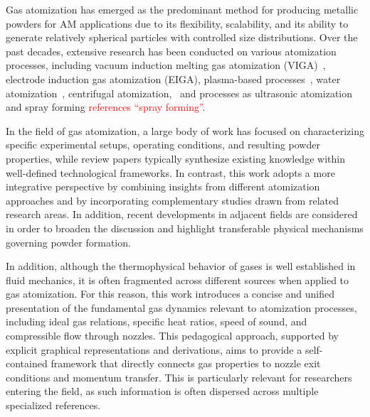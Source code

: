 \documentclass[final,5p,times,twocolumn]{elsarticle}
\begin{document}
Gas atomization has emerged as the predominant method for producing metallic powders for AM applications due to its flexibility, scalability, and its ability to generate relatively spherical particles with controlled size distributions. Over the past decades, extensive research has been conducted on various atomization processes, including vacuum induction melting gas atomization (VIGA)~\cite{Neikov2009HandbookNonFerrous,Kassym2020AtomizationProcesses,Singh2001StudyFree,Goudar2017EffectAtomization,Zou2021PrebreakupMechanism,Ting2002EffectWakeclosure,Wang2024PreciseControl}, electrode induction gas atomization (EIGA), plasma-based processes~\cite{Dion2018PlasmaApparatus,Liu2020BriefIntroduction,Zhao2020CentrifugalGranulation}, water atomization~\cite{Seki1990EffectAtomization}, centrifugal atomization,~\cite{Wu2025ReviewMetal,Zhang2017ParticleSize,Suastiyanti2021DesigningCentrifugal,Zhao2023EffectsProcess,Qiu2012StudyNew} and  processes as ultrasonic atomization~\cite{Balasz2024InvestigationMetal,Ciftcli2025AlloyDevelopment,Priyadarshi2024NewInsights,Wisutmethangoon2011ProductionSAC305} and spray forming \textcolor{red}{references ``spray forming''}.

In the field of gas atomization, a large body of work has focused on characterizing specific experimental setups, operating conditions, and resulting powder properties, while review papers typically synthesize existing knowledge within well-defined technological frameworks. In contrast, this work adopts a more integrative perspective by combining insights from different atomization approaches and by incorporating complementary studies drawn from related research areas. In addition, recent developments in adjacent fields are considered in order to broaden the discussion and highlight transferable physical mechanisms governing powder formation.

In addition, although the thermophysical behavior of gases is well established in fluid mechanics, it is often fragmented across different sources when applied to gas atomization. For this reason, this work introduces a concise and unified presentation of the fundamental gas dynamics relevant to atomization processes, including ideal gas relations, specific heat ratios, speed of sound, and compressible flow through nozzles. This pedagogical approach, supported by explicit graphical representations and derivations, aims to provide a self-contained framework that directly connects gas properties to nozzle exit conditions and momentum transfer. This is particularly relevant for researchers entering the field, as such information is often dispersed across multiple specialized references.
\end{document}
